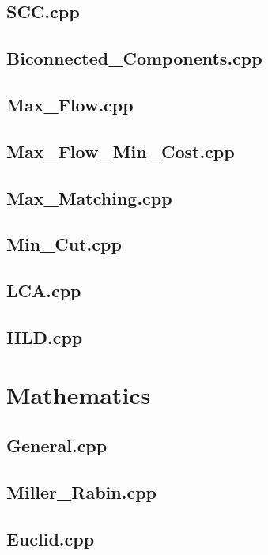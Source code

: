 \subsection{SCC.cpp}

\subsection{Biconnected\_Components.cpp}

\subsection{Max\_Flow.cpp}

\subsection{Max\_Flow\_Min\_Cost.cpp}

\subsection{Max\_Matching.cpp}

\subsection{Min\_Cut.cpp}

\subsection{LCA.cpp}

\subsection{HLD.cpp}

\section{Mathematics}
\subsection{General.cpp}

\subsection{Miller\_Rabin.cpp}

\subsection{Euclid.cpp}

